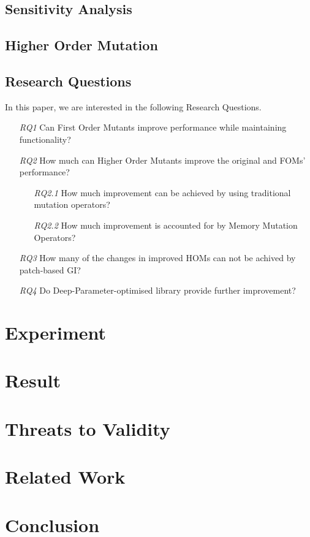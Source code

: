 \documentclass[oribibl]{llncs}
\begin{document}
\subsection{Sensitivity Analysis}
\label{sec_sensitivity}

\subsection{Higher Order Mutation}
\label{sec_hom}

\subsection{Research Questions}
\label{sec_rqs}
In this paper, we are interested in the following Research Questions.

\begin{enumerate}
\item[\emph{RQ1}] Can First Order Mutants improve performance while maintaining functionality?
\end{enumerate}



\begin{enumerate}
\item[\emph{RQ2}] How much can Higher Order Mutants improve the original and FOMs' performance?
 \begin{enumerate}
\item[\emph{RQ2.1}] How much improvement can be achieved by using traditional mutation operators?
\item[\emph{RQ2.2}] How much improvement is accounted for by Memory Mutation Operators?
\end{enumerate}
\item[\emph{RQ3}] How many of the changes in improved HOMs can not be achived by patch-based GI?
\item[\emph{RQ4}] Do Deep-Parameter-optimised library provide further improvement?
\end{enumerate}

\section{Experiment}
\label{sec_exp}

\section{Result}
\label{sec_result}

\section{Threats to Validity}
\label{sec_threat}

\section{Related Work}
\label{sec_related}

\section{Conclusion}
\label{sec_conclusion}


   
\end{document}
